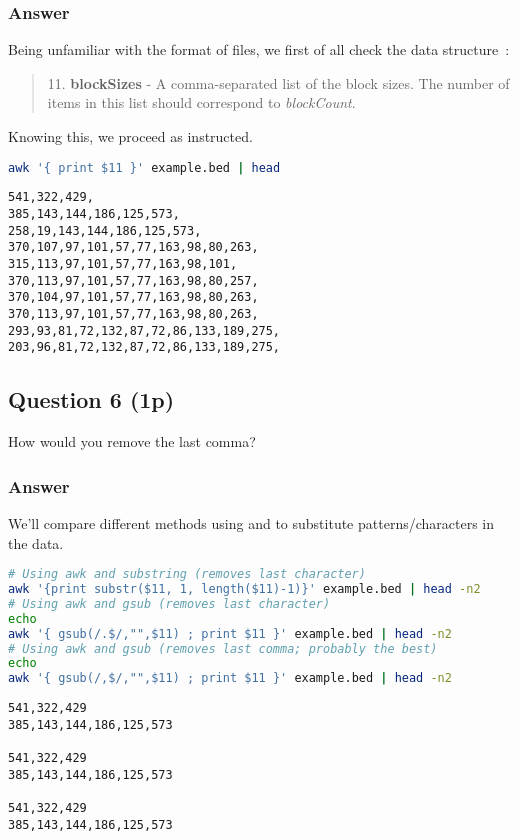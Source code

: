 \subsubsection*{Answer}
Being unfamiliar with the format of  files, we first of all check the data structure~\cite{o:genome}:
\begin{quote}
	11. \textbf{blockSizes} - A comma-separated list of the block sizes. The number of items in this list should correspond to \emph{blockCount}.
\end{quote}
Knowing this, we proceed as instructed.
\begin{lstlisting}[language=bash]
awk '{ print $11 }' example.bed | head
\end{lstlisting}

\begin{lstlisting}[style=output]
541,322,429,
385,143,144,186,125,573,
258,19,143,144,186,125,573,
370,107,97,101,57,77,163,98,80,263,
315,113,97,101,57,77,163,98,101,
370,113,97,101,57,77,163,98,80,257,
370,104,97,101,57,77,163,98,80,263,
370,113,97,101,57,77,163,98,80,263,
293,93,81,72,132,87,72,86,133,189,275,
203,96,81,72,132,87,72,86,133,189,275,
\end{lstlisting}

\subsection*{Question 6 (1p)}
How would you remove the last comma?

\subsubsection*{Answer}
We'll compare different methods using  and  to substitute patterns/characters in the data.
\begin{lstlisting}[language=bash]
# Using awk and substring (removes last character)
awk '{print substr($11, 1, length($11)-1)}' example.bed | head -n2
# Using awk and gsub (removes last character)
echo
awk '{ gsub(/.$/,"",$11) ; print $11 }' example.bed | head -n2
# Using awk and gsub (removes last comma; probably the best)
echo
awk '{ gsub(/,$/,"",$11) ; print $11 }' example.bed | head -n2
\end{lstlisting}

\begin{lstlisting}[style=output]
541,322,429
385,143,144,186,125,573

541,322,429
385,143,144,186,125,573

541,322,429
385,143,144,186,125,573
\end{lstlisting}

